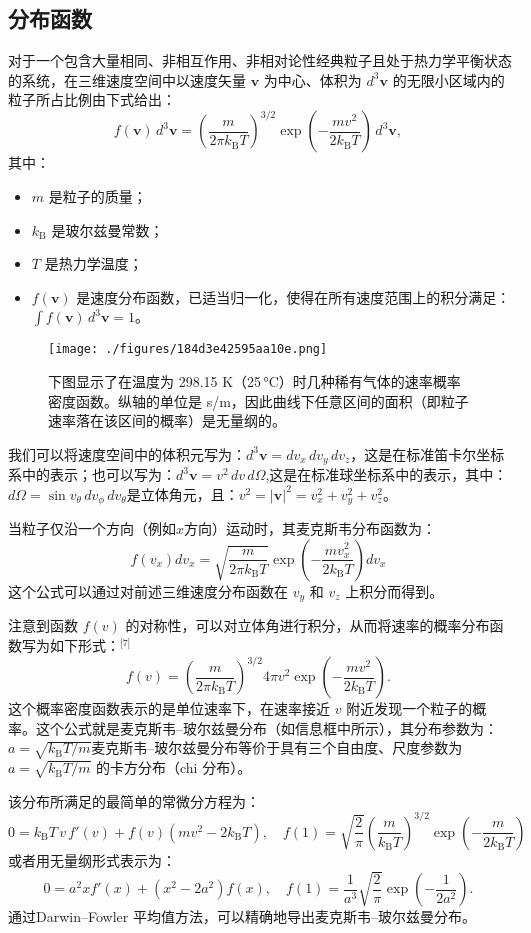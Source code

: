 \subsection{分布函数}
对于一个包含大量相同、非相互作用、非相对论性经典粒子且处于热力学平衡状态的系统，在三维速度空间中以速度矢量 $\mathbf{v}$ 为中心、体积为 $d^3\mathbf{v}$ 的无限小区域内的粒子所占比例由下式给出：
$$
f(\mathbf{v})\, d^3\mathbf{v} = \left( \frac{m}{2\pi k_{\text{B}} T} \right)^{3/2} \exp\left( -\frac{m v^2}{2 k_{\text{B}} T} \right)\, d^3\mathbf{v},~
$$
其中：
\begin{itemize}
\item $m$ 是粒子的质量；
\item $k_{\text{B}}$ 是玻尔兹曼常数；
\item $T$ 是热力学温度；
\item $f(\mathbf{v})$ 是速度分布函数，已适当归一化，使得在所有速度范围上的积分满足：$\int f(\mathbf{v})\, d^3\mathbf{v} = 1$。
\end{itemize}
\begin{figure}[ht]
\centering
\texttt{[image: ./figures/184d3e42595aa10e.png]}
\caption{下图显示了在温度为 298.15 K（25 °C）时几种稀有气体的速率概率密度函数。纵轴的单位是 s/m，因此曲线下任意区间的面积（即粒子速率落在该区间的概率）是无量纲的。} \label{fig_MKBR_1}
\end{figure}
我们可以将速度空间中的体积元写为：$d^3\mathbf{v} = dv_x\, dv_y\, dv_z$，这是在标准笛卡尔坐标系中的表示；也可以写为：$d^3\mathbf{v} = v^2\, dv\, d\Omega$,这是在标准球坐标系中的表示，其中：$d\Omega = \sin{v_{\theta}}\, dv_{\phi}\, dv_{\theta}$是立体角元，且：$v^2 = |\mathbf{v}|^2 = v_x^2 + v_y^2 + v_z^2$。

当粒子仅沿一个方向（例如$x$方向）运动时，其麦克斯韦分布函数为：
$$
f(v_x)dv_x = \sqrt{ \frac{m}{2\pi k_{\text{B}} T} }\exp\left( -\frac{m v_x^2}{2 k_{\text{B}} T} \right)dv_x~
$$
这个公式可以通过对前述三维速度分布函数在 $v_y$ 和 $v_z$ 上积分而得到。

注意到函数 $f(v)$ 的对称性，可以对立体角进行积分，从而将速率的概率分布函数写为如下形式：\(^\text{[7]}\)
$$
f(v) = \left( \frac{m}{2\pi k_{\text{B}} T} \right)^{3/2} 4\pi v^2 \exp\left( -\frac{m v^2}{2 k_{\text{B}} T} \right).~
$$
这个概率密度函数表示的是单位速率下，在速率接近 $v$ 附近发现一个粒子的概率。这个公式就是麦克斯韦–玻尔兹曼分布（如信息框中所示），其分布参数为：$a = \sqrt{k_{\text{B}} T/m}$麦克斯韦–玻尔兹曼分布等价于具有三个自由度、尺度参数为 $a = \sqrt{k_{\text{B}} T / m}$ 的卡方分布（chi 分布）。

该分布所满足的最简单的常微分方程为：
$$
0 = k_{\text{B}} T\, v\, f'(v) + f(v)\left(m v^2 - 2 k_{\text{B}} T\right), \quad
f(1) = \sqrt{\frac{2}{\pi}} \left( \frac{m}{k_{\text{B}} T} \right)^{3/2} \exp\left( -\frac{m}{2 k_{\text{B}} T} \right)~
$$
或者用无量纲形式表示为：
$$
0 = a^2 x f'(x) + \left(x^2 - 2 a^2\right) f(x), \quad
f(1) = \frac{1}{a^3} \sqrt{\frac{2}{\pi}} \exp\left(-\frac{1}{2 a^2} \right).~
$$
通过Darwin–Fowler 平均值方法，可以精确地导出麦克斯韦–玻尔兹曼分布。
